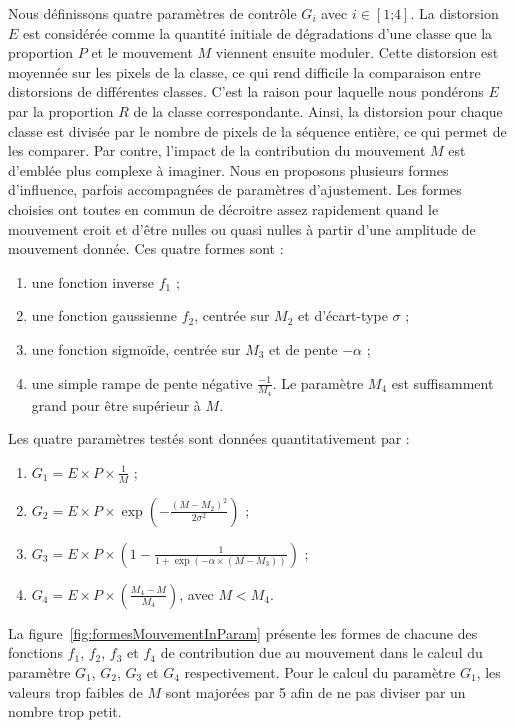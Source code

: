 Nous définissons quatre paramètres de contrôle $G_i$ avec $i\in[\text{1;}\text{4}]$. La distorsion $E$ est considérée comme la quantité initiale de dégradations d'une classe que la proportion $P$ et le mouvement $M$ viennent ensuite moduler. Cette distorsion est moyennée sur les pixels de la classe, ce qui rend difficile la comparaison entre distorsions de différentes classes. C'est la raison pour laquelle nous pondérons $E$ par la proportion $R$ de la classe correspondante. Ainsi, la distorsion pour chaque classe est divisée par le nombre de pixels de la séquence entière, ce qui permet de les comparer. Par contre, l'impact de la contribution du mouvement $M$ est d'emblée plus complexe à imaginer. Nous en proposons plusieurs formes d'influence, parfois accompagnées de paramètres d'ajustement. Les formes choisies ont toutes en commun de décroitre assez rapidement quand le mouvement croit et d'être nulles ou quasi nulles à partir d'une amplitude de mouvement donnée. Ces quatre formes sont :
\begin{enumerate}
\item une fonction inverse $f_1$ ;
\item une fonction gaussienne $f_2$, centrée sur $M_2$ et d'écart-type $\sigma$ ;
\item une fonction sigmoïde, centrée sur $M_3$ et de pente $-\alpha$ ;
\item une simple rampe de pente négative $\frac{-1}{M_4}$. Le paramètre $M_4$ est suffisamment grand pour être supérieur à $M$.
\end{enumerate}
%
Les quatre paramètres testés sont données quantitativement par : %
\begin{enumerate}
\item $G_1 = E\times P\times \frac{1}{M}$ ;
\item $G_2 = E\times P\times \exp\left({-\frac{(M - M_2)^2}{2\sigma^2}}\right)$ ;
\item $G_3 = E\times P\times \left(1 - \frac{1}{1+ \exp\left({-\alpha\times(M - M_3)}\right)}\right)$ ;
\item $G_4 = E\times P\times \left(\frac{M_4-M}{M_4}\right)$, avec $M<M_4$.
\end{enumerate}
%
La figure~\ref{fig:formesMouvementInParam} présente les formes de chacune des fonctions $f_1$, $f_2$, $f_3$ et $f_4$ de contribution due au mouvement dans le calcul du paramètre $G_1$, $G_2$, $G_3$ et $G_4$ respectivement. Pour le calcul du paramètre $G_1$, les valeurs trop faibles de $M$ sont majorées par 5 afin de ne pas diviser par un nombre trop petit.


